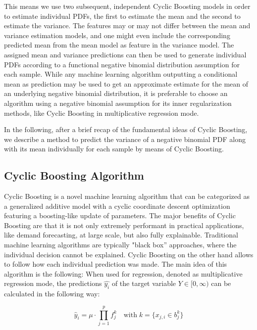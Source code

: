 \documentclass[BCOR=1mm, DIV=calc,10pt,
twoside=true,
twocolumn,
headings=normal]{scrartcl}
\begin{document}
This means we use two subsequent, independent Cyclic Boosting models in order to estimate individual PDFs, the first to estimate the mean and the second to estimate the variance. The features may or may not differ between the mean and variance estimation models, and one might even include the corresponding predicted mean from the mean model as feature in the variance model. The assigned mean and variance predictions can then be used to generate individual PDFs according to a functional negative binomial distribution assumption for each sample. While any machine learning algorithm outputting a conditional mean as prediction may be used to get an approximate estimate for the mean of an underlying negative binomial distribution, it is preferable to choose an algorithm using a negative binomial assumption for its inner regularization methods, like Cyclic Boosting in multiplicative regression mode.

In the following, after a brief recap of the fundamental ideas of Cyclic Boosting, we describe a method to predict the variance of a negative binomial PDF along with its mean individually for each sample by means of Cyclic Boosting.

\subsection{Cyclic Boosting Algorithm}
\label{sec:CB}

Cyclic Boosting \cite{Wick2019} is a novel machine learning algorithm that can be categorized as a generalized additive model with a cyclic coordinate descent optimization featuring a boosting-like update of parameters. The major benefits of Cyclic Boosting are that it is not only extremely performant in practical applications, like demand forecasting, at large scale, but also fully explainable. Traditional machine learning algorithms are typically "black box'' approaches, where the individual decision cannot be explained. Cyclic Boosting on the other hand allows to follow how each individual prediction was made. The main idea of this algorithm is the following: When used for regression, denoted as multiplicative regression mode, the predictions $\hat{y_i}$ of the  target variable $Y \in [0,\infty)$ can be calculated in the following way:

\begin{equation} \label{eqn:cb}
\hat{y}_i = \mu \cdot \prod \limits_{j=1}^p f^k_j \quad \text{with}\; k=\{ x_{j,i} \in b^k_j\}
\end{equation}
\end{document}
